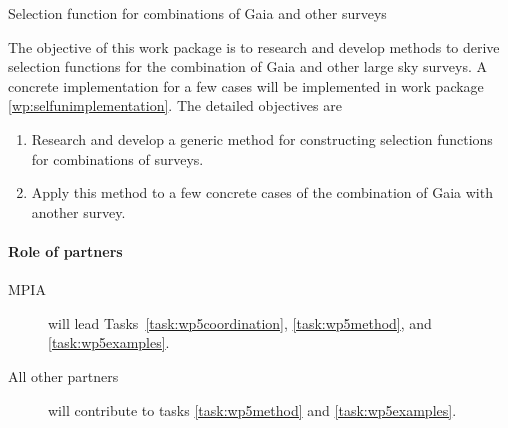 \begin{workpackage}{Selection function for combinations of Gaia and other surveys}
  \label{wp:selfuncombine}
  \wpend{\duration} %

  \makewptable %

  \begin{wpobjectives}
    The objective of this work package is to research and develop methods to derive selection functions for the combination of Gaia and other large sky surveys. A concrete implementation for a few cases will be implemented in work package \ref{wp:selfunimplementation}. The detailed objectives are
    \begin{enumerate}
      \item Research and develop a generic method for constructing selection functions for combinations of surveys.
      \item Apply this method to a few concrete cases of the combination of Gaia with another survey.
    \end{enumerate}
  \end{wpobjectives}

  \begin{wpdescription}

    \paragraph{Role of partners}
    \begin{description}
      \item[MPIA] will lead Tasks~\ref{task:wp5coordination}, \ref{task:wp5method}, and \ref{task:wp5examples}.
      \item[All other partners] will contribute to tasks \ref{task:wp5method} and \ref{task:wp5examples}.
    \end{description}
  \end{wpdescription}


\end{workpackage}
